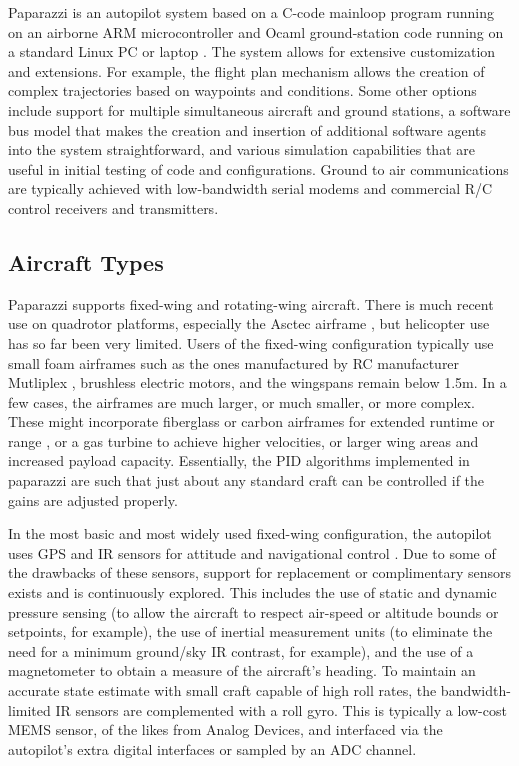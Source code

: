\documentclass[a4paper,11pt]{report}
\begin{document}
Paparazzi is an autopilot system based on a C-code mainloop program running on an airborne ARM microcontroller and Ocaml ground-station code running on a standard Linux PC or laptop \cite{paparazzi}. The system allows for extensive customization and extensions. For example, the flight plan mechanism allows the creation of complex trajectories based on waypoints and conditions. Some other options include support for multiple simultaneous aircraft and ground stations,  a software bus model that makes the creation and insertion of additional software agents into the system straightforward, and various simulation capabilities that are useful in initial testing of code and configurations. Ground to air communications are typically achieved with low-bandwidth serial modems and commercial R/C control receivers and transmitters. 

\subsection{Aircraft Types}

Paparazzi supports fixed-wing and rotating-wing aircraft. There is much recent use on quadrotor platforms, especially the Asctec airframe \cite{asctec}, but helicopter use has so far been very limited. Users of the fixed-wing configuration typically use small foam airframes such as the ones manufactured by RC manufacturer Mutliplex \cite{multiplex}, brushless electric motors, and the wingspans remain below 1.5m. In a few cases, the airframes are much larger, or much smaller, or more complex. These might incorporate fiberglass or carbon airframes for extended runtime \cite{murat} or range \cite{corsica}, or a gas turbine to achieve higher velocities, or larger wing areas and increased payload capacity. Essentially, the PID algorithms implemented in paparazzi are such that just about any standard craft can be controlled if the gains are adjusted properly.

In the most basic and most widely used fixed-wing configuration, the autopilot uses GPS and IR sensors for attitude and navigational control \cite{paparazzi_paper}. Due to some of the drawbacks of these sensors, support for replacement or complimentary sensors exists and is continuously explored. This includes the use of static and dynamic pressure sensing (to allow the aircraft to respect air-speed or altitude bounds or setpoints, for example), the use of inertial measurement units (to eliminate the need for a minimum ground/sky IR contrast, for example), and the use of a magnetometer to obtain a measure of the aircraft's heading. To maintain an accurate state estimate with small craft capable of high roll rates, the bandwidth-limited IR sensors are complemented with a roll gyro. This is typically a low-cost MEMS sensor, of the likes from Analog Devices, and interfaced via the autopilot's extra digital interfaces or sampled by an ADC channel.
\end{document}

